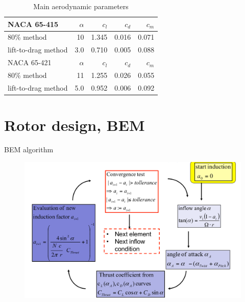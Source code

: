 \documentclass[12pt,t]{beamer}
\begin{document}
\begin{frame}
\footnotesize
\begin{table}[H]
\begin{tabular}{l | r r r r}
NACA 65-415 & $\alpha$ &$c_l$ &$c_d$ & $c_m$\\
\hline
80\% method& 10 & 1.345 & 0.016 & 0.071\\
lift-to-drag method & 3.0 & 0.710 & 0.005 &  0.088\\
\hline
NACA 65-421 & $\alpha$ &$c_l$ &$c_d$ & $c_m$\\
\hline
80\% method& 11 & 1.255 & 0.026 & 0.055\\
lift-to-drag method & 5.0 & 0.952 & 0.006 &  0.092\\
\end{tabular}
\caption{Main aerodynamic parameters}
\end{table}
\end{frame}
\section{Rotor design, BEM}

\begin{frame}
\huge
BEM algorithm
\begin{figure}[H]
\includegraphics[width=0.8\linewidth]{figures/algo.png}
\label{fig:blade_elemets}
\end{figure}
\end{frame}
\end{document}
